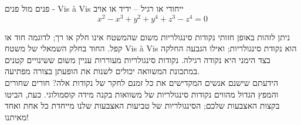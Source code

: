 \begin{surferPage}{פנים מול פנים - Vis \`a Vis}
ייחודי או רגיל – ידיד או אויב
\smallskip
\[x^2	- x^3+ y^2+ y^4+ z^3- z^4	=  0\]

\vspace{0,3cm}
ניתן לזהות באופן חזותי נקודות סינגולריות משום שהמשטח אינו חלק או רך; לדוגמה חוד או קפל.
\vspace{0,3cm}
החוד בחלק השמאלי של משטח Vis \`a Vis הוא נקודת סינגולריות; ואילו הגבעה החלקה בצד הימני היא נקודה רגילה. נקודות סינגולריות מעוררות עניין משום ששינויים קטנים במתכונת המשוואה יכולים לשנות את הופעתן בצורה מפתיעה. \\

\vspace{0,3cm}
הידעתם שישנם אנשים המקדישים את כל זמנם לחקר של נקודות אלה? חורים שחורים והמפץ הגדול מהווים נקודות סינגולריות של משוואות בקנה מידה קוסמולוגי. כעת, הביטו בקצות האצבעות שלכם; הסינגולריות של טביעות האצבעות שלנו מייחדת כל אחת ואחד מאיתנו!
\end{surferPage}
